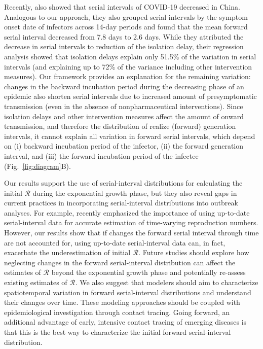 \documentclass[12pt]{article}
\newcommand{\fref}[1]{Fig.~\ref{fig:#1}}
\newcommand{\RR}{\ensuremath{{\mathcal R}}\xspace}
\begin{document}
Recently, \cite{ali2020serial} also showed that serial intervals of COVID-19 decreased in China. Analogous to our approach, they also grouped serial intervals by the symptom onset date of infectors across 14-day periods and found that the mean forward serial interval decreased from 7.8 days to 2.6 days.
While they attributed the decrease in serial intervals to reduction of the isolation delay, their regression analysis showed that isolation delays explain only 51.5\% of the variation in serial intervals (and explaining up to 72\% of the variance including other intervention measures).
Our framework provides an explanation for the remaining variation: changes in the backward incubation period during the decreasing phase of an epidemic also shorten serial intervals due to increased amount of presymptomatic transmission (even in the absence of nonpharmaceutical interventions).
Since isolation delays and other intervention measures affect the amount of onward transmission, and therefore the distribution of realize (forward) generation intervals, it cannot explain all variation in forward serial intervals, which depend on (i) backward incubation period of the infector, (ii) the forward generation interval, and (iii) the forward incubation period of the infectee (\fref{diagram}B).

Our results support the use of serial-interval distributions for calculating the initial \RR during the exponential growth phase,  
but they also reveal gaps in current practices in incorporating serial-interval distributions into outbreak analyses.
For example, \cite{thompson2019improved} recently emphasized the importance of using up-to-date serial-interval data for accurate estimation of time-varying reproduction numbers.
However, our results show that if changes the forward serial interval through time are not accounted for, using up-to-date serial-interval data can, in fact, exacerbate the underestimation of initial \RR.
Future studies should explore how neglecting changes in the forward serial-interval distribution can affect the estimates of \RR beyond the exponential growth phase and potentially re-assess existing estimates of \RR.
We also suggest that modelers should aim to characterize spatiotemporal variation in forward serial-interval distributions and understand their changes over time.
These modeling approaches should be coupled with epidemiological investigation through contact tracing. 
Going forward, an additional advantage of early, intensive contact tracing of emerging diseases is that this is the best way to characterize the initial forward serial-interval distribution.
\end{document}
